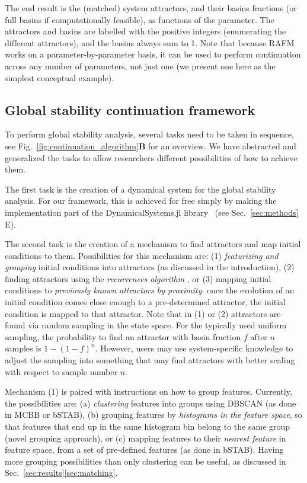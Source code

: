 \documentclass[%
 aip,
 amsmath,amssymb,
 reprint,%
]{revtex4-1}
\begin{document}
The end result is the (matched) system attractors, and their basins fractions (or full basins if computationally feasible), as functions of the parameter. The attractors and basins are labelled with the positive integers (enumerating the different attractors), and the basins always sum to 1.
Note that because RAFM works on a parameter-by-parameter basis, it can be used to perform continuation across any number of parameters, not just one (we present one here as the simplest conceptual example).


\subsection{Global stability continuation framework}
\label{sec:framework}
To perform global stability analysis, several tasks need to be taken in sequence, see Fig.~\ref{fig:continuation_algorithm}\textbf{B} for an overview. We have abstracted and generalized the tasks to allow researchers different possibilities of how to achieve them. 


The first task is the creation of a dynamical system for the global stability analysis. For our framework, this is achieved for free simply by making the implementation part of the DynamicalSystems.jl library~\cite{DynamicalSystems.jl} (see Sec.~\ref{sec:methods} E).

The second task is the creation of a mechanism to find attractors and map initial conditions to them. Possibilities for this mechanism are: (1) \emph{featurizing and grouping} initial conditions into attractors (as discussed in the introduction), (2) finding attractors using the \emph{recurrences algorithm} \cite{DatserisWagemakers2022}, or (3) mapping initial conditions to \emph{previously known attractors by proximity}: once the evolution of an initial condition comes close enough to a pre-determined attractor, the initial condition is mapped to that attractor. Note that in (1) or (2) attractors are found via random sampling in the state space. For the typically used uniform sampling, the probability to find an attractor with basin fraction $f$ after $n$ samples is $1 - (1 - f)^n$. However, users may use system-specific knowledge to adjust the sampling into something that may find attractors with better scaling with respect to sample number $n$.

Mechanism (1) is paired with instructions on how to group features. Currently, the possibilities are: (a) \emph{clustering} features into groups using DBSCAN (as done in MCBB or bSTAB), (b) grouping features by \emph{histograms in the feature space}, so that features that end up in the same histogram bin belong to the same group (novel grouping approach), or (c) mapping features to their \emph{nearest feature} in feature space, from a set of pre-defined features (as done in bSTAB). Having more grouping possibilities than only clustering can be useful, as discussed in Sec.~\ref{sec:results}\ref{sec:matching}.
\end{document}
